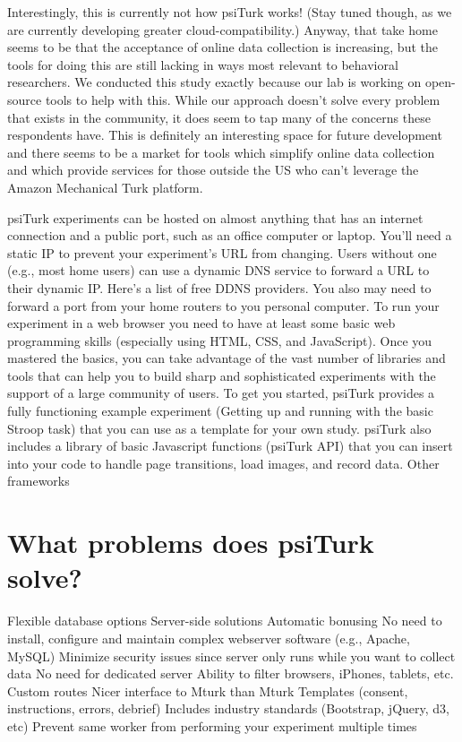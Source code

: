 \documentclass[jou,apacite]{apa6}
\begin{document}
Interestingly, this is currently not how psiTurk works! (Stay tuned though, as we are currently developing greater cloud-compatibility.)
Anyway, that take home seems to be that the acceptance of online data collection is increasing, but the tools for doing this are still lacking in ways most relevant to behavioral researchers.
We conducted this study exactly because our lab is working on open-source tools to help with this.
While our approach doesn't solve every problem that exists in the community, it does seem to tap many of the concerns these respondents have.
This is definitely an interesting space for future development and there seems to be a market for tools which simplify online data collection and which provide services for those outside the US who can't leverage the Amazon Mechanical Turk platform.

psiTurk experiments can be hosted on almost anything that has an internet connection and a public port, such as an office computer or laptop.
You'll need a static IP to prevent your experiment's URL from changing. 
Users without one (e.g., most home users) can use a dynamic DNS service to forward a URL to their dynamic IP.
Here's a list of free DDNS providers.
You also may need to forward a port from your home routers to you personal computer.
To run your experiment in a web browser you need to have at least some basic web programming skills (especially using HTML, CSS, and JavaScript).
Once you mastered the basics, you can take advantage of the vast number of libraries and tools that can help you to build sharp and sophisticated experiments with the support of a large community of users.
To get you started, psiTurk provides a fully functioning example experiment (Getting up and running with the basic Stroop task) that you can use as a template for your own study.
psiTurk also includes a library of basic Javascript functions (psiTurk API) that you can insert into your code to handle page transitions, load images, and record data.
Other frameworks 

\section{What problems does psiTurk solve?}
Flexible database options
Server-side solutions
Automatic bonusing
No need to install, configure and maintain complex webserver software (e.g., Apache, MySQL)
Minimize security issues since server only runs while you want to collect data
No need for dedicated server
Ability to filter browsers, iPhones, tablets, etc. 
Custom routes
Nicer interface to Mturk than Mturk 
Templates (consent, instructions, errors, debrief)
Includes industry standards (Bootstrap, jQuery, d3, etc) 
Prevent same worker from performing your experiment multiple times
\end{document}
